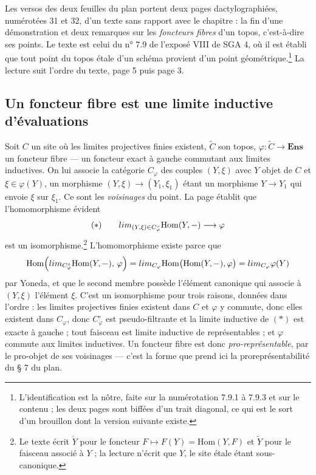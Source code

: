 \documentclass[11pt,a4paper]{article}
\begin{document}
Les versos des deux feuilles du plan portent deux pages dactylographiées,
numérotées 31 et 32, d'un texte sans rapport avec le chapitre : la fin d'une
démonstration et deux remarques sur les \emph{foncteurs fibres} d'un topos,
c'est-à-dire ses points. Le texte est celui du n° 7.9 de l'exposé VIII de
SGA 4, où il est établi que tout point du topos étale d'un schéma provient
d'un point géométrique.\footnote{L'identification est la nôtre, faite sur la
numérotation 7.9.1 à 7.9.3 et sur le contenu ; les deux pages sont biffées
d'un trait diagonal, ce qui est le sort d'un brouillon dont la version
suivante existe.} La lecture suit l'ordre du texte, page 5 puis page 3.

\subsection*{Un foncteur fibre est une limite inductive d'évaluations}

Soit $C$ un site où les limites projectives finies existent, $\widetilde{C}$
son topos, $\varphi : \widetilde{C} \to \mathbf{Ens}$ un foncteur fibre — un
foncteur exact à gauche commutant aux limites inductives. On lui associe la
catégorie $C_\varphi$ des couples $(Y, \xi)$ avec $Y$ objet de $C$ et $\xi \in
\varphi(Y)$, un morphisme $(Y, \xi) \to (Y_1, \xi_1)$ étant un morphisme $Y
\to Y_1$ qui envoie $\xi$ sur $\xi_1$. Ce sont les \emph{voisinages} du point.
La page établit que l'homomorphisme évident
\[
  (\ast) \qquad \varinjlim_{(Y, \xi) \in C_\varphi^{\circ}} \mathrm{Hom}(Y, -) \longrightarrow \varphi
\]
est un isomorphisme.\footnote{Le texte écrit $\check{Y}$ pour le foncteur
$F \mapsto F(Y) = \mathrm{Hom}(Y, F)$ et $\widetilde{Y}$ pour le faisceau
associé à $Y$ ; la lecture n'écrit que $Y$, le site étale étant sous-canonique.}
L'homomorphisme existe parce que
\[
  \mathrm{Hom}\Bigl(\varinjlim_{C_\varphi^{\circ}} \mathrm{Hom}(Y, -),\, \varphi\Bigr)
  = \varprojlim_{C_\varphi} \mathrm{Hom}\bigl(\mathrm{Hom}(Y, -), \varphi\bigr)
  = \varprojlim_{C_\varphi} \varphi(Y)
\]
par Yoneda, et que le second membre possède l'élément canonique qui associe
à $(Y, \xi)$ l'élément $\xi$. C'est un isomorphisme pour trois raisons,
données dans l'ordre : les limites projectives finies existent dans $C$ et
$\varphi$ y commute, donc elles existent dans $C_\varphi$, donc
$C_\varphi^{\circ}$ est pseudo-filtrante et la limite inductive de $(\ast)$
est exacte à gauche ; tout faisceau est limite inductive de représentables ;
et $\varphi$ commute aux limites inductives. Un foncteur fibre est donc
\emph{pro-représentable}, par le pro-objet de ses voisinages — c'est la forme
que prend ici la proreprésentabilité du § 7 du plan.
\end{document}

